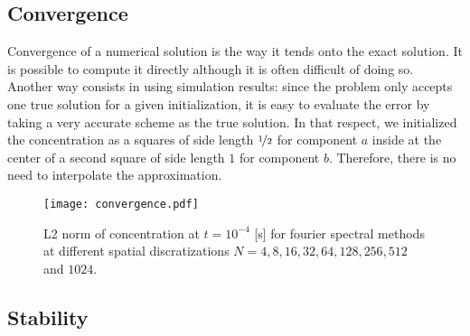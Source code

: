 \documentclass[10pt,a4paper,twocolumn]{article}
\begin{document}
\subsection{Convergence} %
\label{sub:convergence}

Convergence of a numerical solution is the way it tends onto the exact solution. It is possible to compute it directly although it is often difficult of doing so. Another way consists in using simulation results: since the problem only accepts one true solution for a given initialization, it is easy to evaluate the error by taking a very accurate scheme as the true solution. In that respect, we initialized the concentration as a squares of side length $\nicefrac{1}{2}$ for component $a$ inside at the center of a second square of side length $1$ for component $b$. Therefore, there is no need to interpolate the approximation.
\begin{figure}
	\centering
	\texttt{[image: convergence.pdf]}
	\caption{L2 norm of concentration at $t = 10^{-4}$ [s] for fourier spectral methods at different spatial discratizations $N = 4,8,16,32,64,128,256,512$ and $1024$.}
	\label{fig:convergence}
\end{figure}

\subsection{Stability} %
\label{sub:stability}
\end{document}
